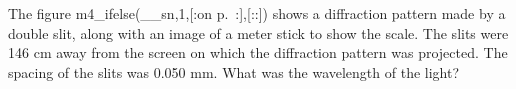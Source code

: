 The figure 
m4_ifelse(__sn,1,[:on p.~\pageref{fig:hw-with-ruler}:],[::]) shows a diffraction pattern made by a double
slit, along with an image of a meter stick to show the
scale. The slits were 146 cm away from the screen on which
the diffraction pattern was projected. The spacing of the
slits was 0.050 mm. What was the wavelength of the light?\answercheck
